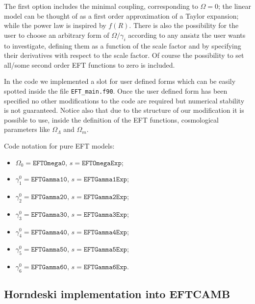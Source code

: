 \documentclass[prd,nofootinbib,showpacs]{revtex4}
\begin{document}
{The first option includes the minimal coupling, corresponding to $\Omega=0$; the linear model  can be thought of as a first order approximation of a Taylor expansion; while the power law is inspired by $f(R)$. There is also the possibility for the user to choose an arbitrary form of $\Omega/\gamma_i$  according to any ans$\ddot{\text{a}}$tz the user wants to investigate, defining them as a function of the scale factor and by specifying their derivatives with respect to the scale factor.  Of course the possibility to set all/some second order EFT functions to zero is included.

In the code we implemented a slot for user defined forms which can be easily spotted inside the file \verb|EFT_main.f90|.
Once the user defined form has been specified no other modifications to the code are required but numerical stability is not guaranteed.
Notice also that due to the structure of our modification it is possible to use, inside the definition of the EFT functions, cosmological parameters like $\Omega_\Lambda$ and $\Omega_m$. 

Code notation for pure EFT models:
%
\begin{itemize}
\item $\Omega_0 = \texttt{EFTOmega0}$, $s = \texttt{EFTOmegaExp}$;
\item $\gamma_1^0 = \texttt{EFTGamma10}$, $s = \texttt{EFTGamma1Exp}$;
\item $\gamma_2^0 = \texttt{EFTGamma20}$, $s = \texttt{EFTGamma2Exp}$;
\item $\gamma_3^0 = \texttt{EFTGamma30}$, $s = \texttt{EFTGamma3Exp}$;
\item $\gamma_4^0 = \texttt{EFTGamma40}$, $s = \texttt{EFTGamma4Exp}$;
\item $\gamma_5^0 = \texttt{EFTGamma50}$, $s = \texttt{EFTGamma5Exp}$;
\item $\gamma_6^0 = \texttt{EFTGamma60}$, $s = \texttt{EFTGamma6Exp}$.
\end{itemize}


\subsection{Horndeski implementation into EFTCAMB}\label{pureHorndeski}

}
\end{document}
